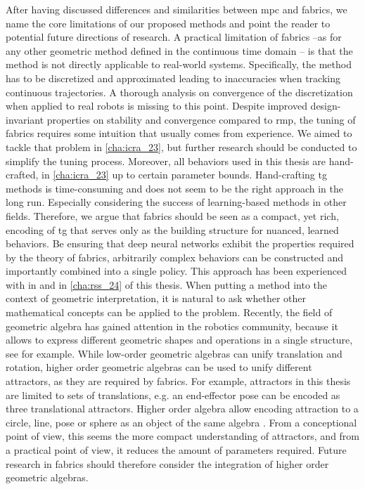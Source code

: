 After having discussed differences and similarities between
\ac{mpc} and \ac{fabrics}, we name the core limitations of
our proposed methods and point the reader to potential
future directions of research. 
A practical limitation of \ac{fabrics} --as for any other
geometric method defined in the continuous time domain --
is that the method is not directly applicable to real-world
systems. Specifically, the method has to be discretized and
approximated leading to inaccuracies when tracking continuous
trajectories. A thorough analysis on convergence of the discretization
when applied to real robots is missing to this point.
Despite improved design-invariant properties on stability
and convergence compared to \ac{rmp}, the tuning of \ac{fabrics} requires some
intuition that usually comes from experience. We aimed to
tackle that problem in \cref{cha:icra_23}, but further
research should be conducted to simplify the tuning process.
Moreover, all behaviors used in this thesis are
hand-crafted, in \cref{cha:icra_23} up to certain
parameter bounds. Hand-crafting \ac{tg} methods is time-consuming
and does not seem to be the right approach in the long run.
Especially considering the success of learning-based methods
in other fields. Therefore, we argue that \ac{fabrics}
should be seen as a compact, yet rich, encoding of
\ac{tg} that serves only as the building structure for
nuanced, learned behaviors. Be ensuring that deep neural
networks exhibit the properties required by the theory of 
\ac{fabrics}, arbitrarily complex behaviors can be
constructed and importantly combined into a single policy.
This approach has been experienced with in \cite{xie2023neural}
and in \cref{cha:rss_24} of this thesis.
When putting a method into the context of geometric
interpretation, it is natural to ask whether other
mathematical concepts can be applied to the problem.
Recently, the field of geometric algebra has gained 
attention in the robotics community, because it allows
to express different geometric shapes and operations in a
single structure, see \cite{low2023geometric} for example.
While low-order geometric algebras can unify translation and
rotation, higher order geometric algebras can be used to unify
different attractors, as they are required by \ac{fabrics}.
For example, attractors in this thesis are limited to
sets of translations, e.g. an end-effector pose can be
encoded as three translational attractors. Higher order
algebra allow encoding attraction to a circle, line, pose
or sphere as an object of the same algebra \cite{low2023geometric}.
From a conceptional point of view, this seems the more
compact understanding of attractors, and from a practical
point of view, it reduces the amount of parameters required.
Future research in \ac{fabrics} should therefore consider
the integration of higher order geometric algebras.





